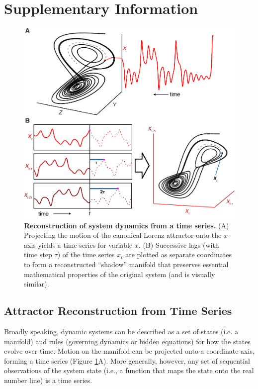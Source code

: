 \section{Supplementary Information}
\label{salmon_supplement}

\begin{figure}[!ht]
\begin{center}\includegraphics[width=\maxwidth{\textwidth}]{fig_salmon_s1.pdf}\end{center}
\caption[Reconstruction of system dynamics from a time series.]{\textbf{Reconstruction of system dynamics from a time series.}\newline
(A) Projecting the motion of the canonical Lorenz attractor onto the $x$-axis yields a time series for variable $x$. (B) Successive lags (with time step $\tau$) of the time series $x_t$ are plotted as separate coordinates to form a reconstructed ``shadow'' manifold that preserves essential mathematical properties of the original system (and is visually similar).}
\label{fig_salmon_lorenz_reconstruction}
\end{figure}

\subsection{Attractor Reconstruction from Time Series}

Broadly speaking, dynamic systems can be described as a set of states (i.e. a manifold) and rules (governing dynamics or hidden equations) for how the states evolve over time. Motion on the manifold can be projected onto a coordinate axis, forming a time series (Figure \ref{fig_salmon_lorenz_reconstruction}A). More generally, however, any set of sequential observations of the system state (i.e., a function that maps the state onto the real number line) is a time series.

